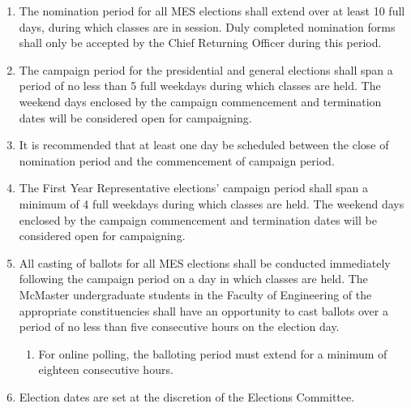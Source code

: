 \begin{enumerate}
 \item
  The nomination period for all MES elections shall extend over at least 10 full days, during which classes are in session. Duly completed nomination forms shall only be accepted by the Chief Returning Officer during this period.
 \item
  The campaign period for the presidential and general elections shall span a period of no less than 5 full weekdays during which classes are held. The weekend days enclosed by the campaign commencement and termination dates will be considered open for campaigning.
 \item
  It is recommended that at least one day be scheduled between the close of nomination period and the commencement of campaign period.
 \item
  The First Year Representative elections' campaign period shall span a minimum of 4 full weekdays during which classes are held. The weekend days enclosed by the campaign commencement and termination dates will be considered open for campaigning.
 \item
  All casting of ballots for all MES elections shall be conducted immediately following the campaign period on a day in which classes are held. The McMaster undergraduate students in the Faculty of Engineering of the appropriate constituencies shall have an opportunity to cast ballots over a period of no less than five consecutive hours on the election day.

  \begin{enumerate}
   \item
    For online polling, the balloting period must extend for a minimum of eighteen consecutive hours.
  \end{enumerate}
 \item
  Election dates are set at the discretion of the Elections Committee. %

\end{enumerate}
